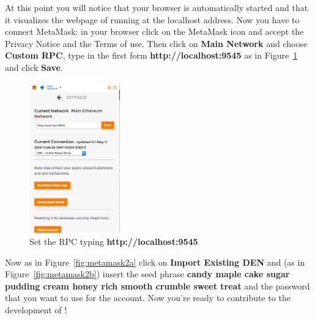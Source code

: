 At this point you will notice that your browser is automatically started and that it visualizes the webpage of \ProjectName{} running at the localhost address. Now you have to connect MetaMask: in your browser click on the MetaMask icon and accept the Privacy Notice and the Terms of use. Then click on \textbf{Main Network} and choose \textbf{Custom RPC}, type in the first form \textbf{http://localhost:9545} as in Figure~\ref{fig:metamask1} and click \textbf{Save}.
\begin{figure}[H]
	\centering
	\includegraphics[width=0.35\textwidth]{img/settings.png}
	\caption{Set the RPC typing \textbf{http://localhost:9545}}
	\label{fig:metamask1}
\end{figure}

Now as in Figure~\ref{fig:metamask2a}  click on \textbf{Import Existing DEN} and (as in Figure~\ref{fig:metamask2b}) insert the seed phrase \textbf{candy maple cake sugar pudding cream honey rich smooth crumble sweet treat} and the password that you want to use for the account. Now you're ready to contribute to the development of \project!

